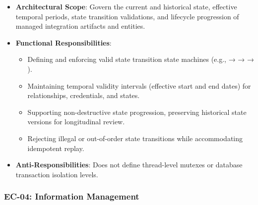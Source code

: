 \begin{itemize}

\item 
\textbf{Architectural Scope}: Govern the current and historical state, effective temporal periods, state transition validations, and lifecycle progression of managed integration artifacts and entities.



\item 
\textbf{Functional Responsibilities}:


\begin{itemize}

\item 
Defining and enforcing valid state transition state machines (e.g., \texttt{} → \texttt{} → \texttt{} → \texttt{}).



\item 
Maintaining temporal validity intervals (effective start and end dates) for relationships, credentials, and states.



\item 
Supporting non-destructive state progression, preserving historical state versions for longitudinal review.



\item 
Rejecting illegal or out-of-order state transitions while accommodating idempotent replay.



\end{itemize}


\item 
\textbf{Anti-Responsibilities}: Does not define thread-level mutexes or database transaction isolation levels.



\end{itemize}
\label{rad:enterprise:130}
\subsubsection*{EC-04: Information Management}
\label{rad:enterprise:131}

